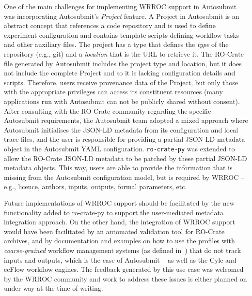 One of the main challenges for implementing WRROC support in Autosubmit was incorporating Autosubmit's \emph{Project} feature.
%
A Project in Autosubmit is an abstract concept that references a code repository and is used to define experiment configuration and contains template scripts defining workflow tasks and other auxiliary files.
%
%
The project has a type that defines the \emph{type} of the repository (e.g., git) and a \emph{location} that is the URL to retrieve it.
The RO-Crate file generated by Autosubmit includes the project type and location, but it does not include the complete Project and so it is lacking configuration details and scripts.
Therefore, users receive provenance data of the Project, but only those with the appropriate privileges can access its constituent resources (many applications run with Autosubmit can not be publicly shared without consent).
%
After consulting with the RO-Crate community regarding the specific Autosubmit requirements, the Autosubmit team adopted a mixed approach where Autosubmit initialises the JSON-LD metadata from its configuration and local trace files, and the user is responsible for providing a partial JSON-LD metadata object in the Autosubmit YAML configuration.
\texttt{ro-crate-py} was extended to allow the RO-Crate JSON-LD metadata to be patched by these partial JSON-LD metadata objects.
This way, users are able to provide the information that is missing from the Autosubmit configuration model, but is required by WRROC -- e.g., licence, authors, inputs, outputs, formal parameters, etc.

Future implementations of WRROC support should be facilitated by the new
functionality added to ro-crate-py to support the user-mediated metadata
integration approach.
%
On the other hand, the integration of WRROC support would have been facilitated by an automated validation tool for RO-Crate archives, and by documentation and examples on how to use the profiles with \emph{coarse-grained} workflow management systems (as defined in~\cite{Goble 2020}) that do not track inputs and outputs, which is the case of Autosubmit -- as well as the Cylc and ecFlow workflow engines.  The feedback generated by this use case was welcomed by the WRROC community and work to address these issues is either planned on under way at the time of writing.

